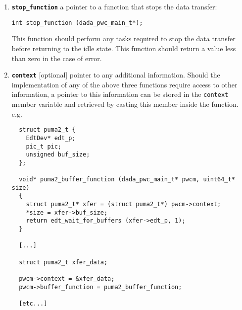 \begin{enumerate}
\item {\bf {\tt stop\_function}} a pointer to a function that stops
  the data transfer:
\begin{verbatim}
int stop_function (dada_pwc_main_t*);
\end{verbatim}
  This function should perform any tasks required to stop the data
  transfer before returning to the idle state.  This function should return
  a value less than zero in the case of error.

\item {\bf {\tt context}} [optional] pointer to any additional information.
  Should the implementation of any of the above three functions
  require access to other information, a pointer to this information
  can be stored in the {\tt context} member variable and retrieved by
  casting this member inside the function. e.g.
\begin{verbatim}
  struct puma2_t {
    EdtDev* edt_p;
    pic_t pic;
    unsigned buf_size;
  };

  void* puma2_buffer_function (dada_pwc_main_t* pwcm, uint64_t* size)
  {
    struct puma2_t* xfer = (struct puma2_t*) pwcm->context;
    *size = xfer->buf_size;
    return edt_wait_for_buffers (xfer->edt_p, 1);
  }

  [...]

  struct puma2_t xfer_data;

  pwcm->context = &xfer_data;
  pwcm->buffer_function = puma2_buffer_function;

  [etc...]
\end{verbatim}

\end{enumerate}
